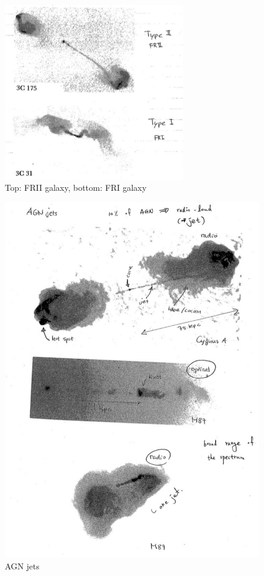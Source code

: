 \begin{enumerate}[a)]
\begin{figure}[!htbp]
   \centering
   \includegraphics[width=0.7\textwidth]{HighEnergy/note04}
   \caption{Top: FRII galaxy, bottom: FRI galaxy}
\label{fig:FR}
\end{figure}

\begin{figure}[!htbp]
   \centering
   \includegraphics[width=\textwidth]{HighEnergy/note05}
   \caption{AGN jets}
\label{fig:angjets}
\end{figure}


\end{enumerate}
